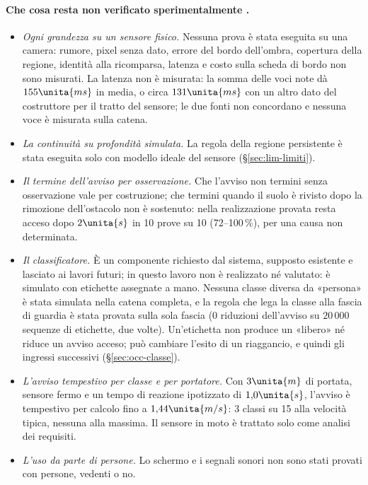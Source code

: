 \paragraph{Che cosa resta non verificato sperimentalmente .}
\begin{itemize}
\item \emph{Ogni grandezza su un sensore fisico.} Nessuna prova è stata eseguita su una camera: rumore, pixel senza dato, errore del bordo dell'ombra, copertura della regione, identità alla ricomparsa, latenza e costo sulla scheda di bordo non sono misurati. La latenza non è misurata: la somma delle voci note dà $155\unita{ms}$ in media, o circa $131\unita{ms}$ con un altro dato del costruttore per il tratto del sensore; le due fonti non concordano e nessuna voce è misurata sulla catena.
\item \emph{La continuità su profondità simulata.} La regola della regione persistente è stata eseguita solo con modello ideale del sensore (\S\ref{sec:lim-limiti}).
\item \emph{Il termine dell'avviso per osservazione.} Che l'avviso non termini senza osservazione vale per costruzione; che termini quando il suolo è rivisto dopo la rimozione dell'ostacolo non è sostenuto: nella realizzazione provata resta acceso dopo $2\unita{s}$ in 10 prove su 10 (72--100\,\%), per una causa non determinata.
\item \emph{Il classificatore.} È un componente richiesto dal sistema, supposto esistente e lasciato ai lavori futuri; in questo lavoro non è realizzato né valutato: è simulato con etichette assegnate a mano. Nessuna classe diversa da «persona» è stata simulata nella catena completa, e la regola che lega la classe alla fascia di guardia è stata provata sulla sola fascia (0 riduzioni dell'avviso su $20\,000$ sequenze di etichette, due volte). Un'etichetta non produce un «libero» né riduce un avviso acceso; può cambiare l'esito di un riaggancio, e quindi gli ingressi successivi (\S\ref{sec:occ-classe}).
\item \emph{L'avviso tempestivo per classe e per portatore.} Con $3\unita{m}$ di portata, sensore fermo e un tempo di reazione ipotizzato di $1{,}0\unita{s}$, l'avviso è tempestivo per calcolo fino a $1{,}44\unita{m/s}$: 3 classi su 15 alla velocità tipica, nessuna alla massima. Il sensore in moto è trattato solo come analisi dei requisiti.
\item \emph{L'uso da parte di persone.} Lo schermo e i segnali sonori non sono stati provati con persone, vedenti o no.
\end{itemize}

